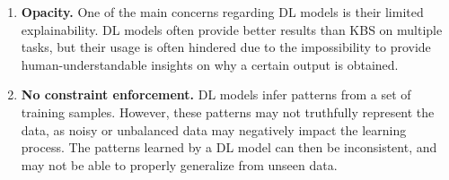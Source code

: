 \begin{enumerate} [start=1,label={\bfseries L\arabic*.}]
    \item \label{kbsintrodl_L_opacity} \textbf{Opacity.} One of the main concerns regarding DL models is their limited explainability. DL models often provide better results than KBS on multiple tasks, but their usage is often hindered due to the impossibility to provide human-understandable insights on why a certain output is obtained.
    
    \item \label{kbsintrodl_L_constraint} \textbf{No constraint enforcement.} DL models infer patterns from a set of training samples. However, these patterns may not truthfully represent the data, as noisy or unbalanced data may negatively impact the learning process. The patterns learned by a DL model can then be inconsistent, and may not be able to properly generalize from unseen data.
    \end{enumerate}
